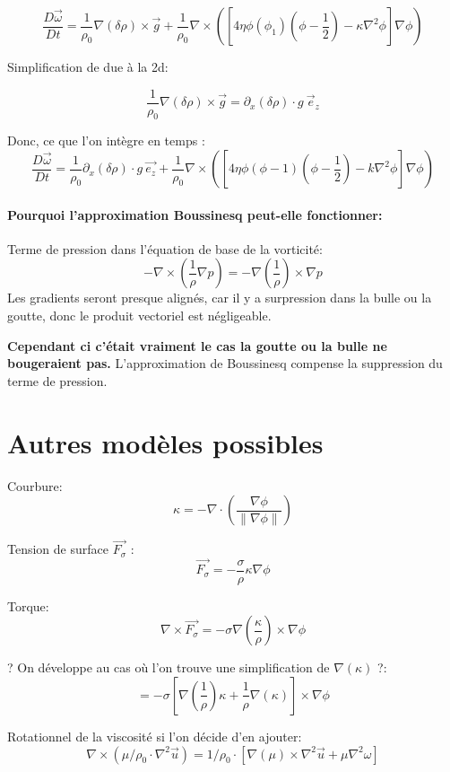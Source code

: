 \documentclass[10pt,a4paper]{article}
\begin{document}
\[
	\dfrac{D \vec{\omega}}{D t} = \dfrac{1}{\rho_0} \nabla (\delta \rho) \times \vec{g} + \dfrac{1}{\rho_0} \nabla \times \left( \left[ 4 \eta \phi (\phi_1) \left(\phi - \dfrac{1}{2}\right) - \kappa \nabla^2 \phi \right] \nabla \phi \right)
\]

Simplification de  due à la 2d: 

\[  \dfrac{1}{\rho_0} \nabla (\delta \rho) \times \vec{g} = \partial_x (\delta \rho) \cdot g~\vec{e}_z \]


Donc, ce que l'on intègre en temps :
\[
	\dfrac{D \vec{\omega}}{D t} = \dfrac{1}{\rho_0} \partial_x (\delta \rho ) \cdot g ~\vec{e_z} + \dfrac{1}{\rho_0} \nabla \times \left( \left[ 4 \eta \phi (\phi - 1) \left(\phi - \dfrac{1}{2} \right) - k\nabla^2 \phi \right] \nabla \phi\right)
\]

\paragraph{Pourquoi l'approximation Boussinesq peut-elle fonctionner:}

Terme de pression dans l'équation de base de la vorticité:
\[ -\nabla \times \left( \frac{1}{\rho} \nabla p \right) = -\nabla \left( \frac{1}{\rho} \right) \times \nabla p \] 
Les gradients seront presque alignés, car il y a surpression dans la bulle ou la goutte, donc le produit vectoriel est négligeable.

\textbf{Cependant ci c'était vraiment le cas la goutte ou la bulle ne bougeraient pas.} L'approximation de Boussinesq 
 compense la suppression du terme de pression.
\section{Autres modèles possibles}



Courbure:
\[ \kappa = - \nabla \cdot \left( \frac{\nabla\phi}{\left\| \nabla \phi \right\|} \right) \] 

Tension de surface $\vec{F_{\sigma}}$ :
\[ \vec{F_{\sigma}}= - \frac{\sigma}{\rho} \kappa \nabla \phi \]

Torque:
\[ \nabla \times \vec{F_{\sigma}} = - \sigma\nabla\left( \frac{\kappa}{\rho}\right)\times \nabla \phi \]

? On développe au cas où l'on trouve une simplification de $\nabla(\kappa)$ ?:
\[ =-\sigma \left[ \nabla\left( \frac{1}{\rho}\right)\kappa + \frac{1}{\rho} \nabla(\kappa) \right]\times \nabla\phi \]

Rotationnel de la viscosité si l'on décide d'en ajouter:
\[
\nabla\times (\mu/\rho_0\cdot\nabla^2\vec{u}) = 1/\rho_0 \cdot \left[ \nabla(\mu) \times \nabla^2\vec{u} + \mu \nabla^2\omega \right]
\]
\end{document}
